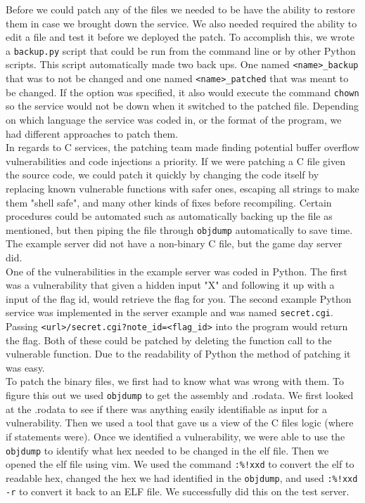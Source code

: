 \documentclass[12pt]{report}
\begin{document}
\noindent Before we could patch any of the files we needed to be have the ability to restore them in case we brought down the service. We also needed required the ability to edit a file and test it before we deployed the patch. To accomplish this, we wrote a \texttt{backup.py} script that could be run from the command line or by other Python scripts. 
This script automatically made two back ups. One named \texttt{<name>\_backup} that was to not be changed and one named \texttt{<name>\_patched} that was meant to be changed. If the option was specified, it also would execute the command \texttt{chown} so the service would not be down when it switched to the patched file. Depending on which language the service was coded in, or the format of the program, we had different approaches to patch them.\\

\noindent In regards to C services, the patching team made finding potential buffer overflow vulnerabilities and code injections a priority. If we were patching a C file given the source code, we could patch it quickly by changing the code itself by replacing known vulnerable functions with safer ones, escaping all strings to make them "shell safe", and many other kinds of fixes before recompiling. Certain procedures could be automated such as automatically backing up the file as mentioned, but then piping the file through \texttt{objdump} automatically to save time. The example server did not have a non-binary C file, but the game day server did.\\

\noindent One of the vulnerabilities in the example server was coded in Python. The first was a vulnerability that given a hidden input "X" and following it up with a input of the flag id, would retrieve the flag for you. The second example Python service was implemented in the server example and was named \texttt{secret.cgi}. Passing \texttt{<url>/secret.cgi?note\_id=<flag\_id>} into the program would return the flag. Both of these could be patched by deleting the function call to the vulnerable function. Due to the readability of Python the method of patching it was easy.\\


\noindent To patch the binary files, we first had to know what was wrong with them. To figure this out we used \texttt{objdump} to get the assembly and .rodata. We first looked at the .rodata to see if there was anything easily identifiable as input for a vulnerability. Then we used a tool that gave us a view of the C files logic (where if statements were). Once we identified a vulnerability, we were able to use the \texttt{objdump} to identify what hex needed to be changed in the elf file. Then we opened the elf file using vim. We used the command \texttt{:\%!xxd} to convert the elf to readable hex, changed the hex we had identified in the \texttt{objdump}, and used \texttt{:\%!xxd -r} to convert it back to an ELF file. We successfully did this on the test server.
\end{document}
